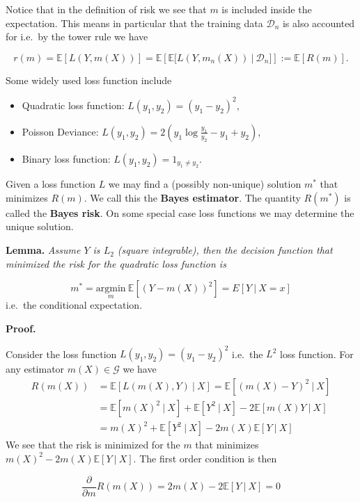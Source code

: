 \documentclass[
]{book}
\providecommand{\tightlist}{%
  \setlength{\itemsep}{0pt}\setlength{\parskip}{0pt}}
\begin{document}
Notice that in the definition of risk we see that \(m\) is included inside the expectation. This means in particular that the training data \(\mathcal{D}_n\) is also accounted for i.e.~by the tower rule we have

\[
r(m)=\mathbb{E}[L(Y,m(X))]=\mathbb{E}\left[\mathbb{E}\Big[L(Y,m_n(X))\ \Big\vert\ \mathcal{D}_n\Big]\right]:=\mathbb{E}\left[R(m)\right].
\]

Some widely used loss function include

\begin{itemize}
\tightlist
\item
  Quadratic loss function: \(L(y_1,y_2)=(y_1-y_2)^2\),
\item
  Poisson Deviance: \(L(y_1,y_2)=2\left(y_1\log\frac{y_1}{y_2}-y_1+y_2\right)\),
\item
  Binary loss function: \(L(y_1,y_2)=1_{y_1\ne y_2}\).
\end{itemize}

Given a loss function \(L\) we may find a (possibly non-unique) solution \(m^*\) that minimizes \(R(m)\). We call this the \textbf{Bayes estimator}. The quantity \(R(m^*)\) is called the \textbf{Bayes risk}. On some special case loss functions we may determine the unique solution.

\textbf{Lemma.} \emph{Assume \(Y\) is \(L_2\) (square integrable), then the decision function that minimized the risk for the quadratic loss function is}

\[
m^*=\underset{m}{\text{argmin}}\ \mathbb{E}[(Y-m(X))^2]=E[Y\ \vert\ X=x]
\]
i.e.~the conditional expectation.

\textbf{Proof.}

Consider the loss function \(L(y_1,y_2)=(y_1-y_2)^2\) i.e.~the \(L^2\) loss function. For any estimator \(m(X)\in \mathcal G\) we have
\begin{align*}
R(m(X))&=\mathbb E[L(m(X),Y)\ \vert\ X]=\mathbb E[(m(X)-Y)^2\ \vert\ X]\\
&=\mathbb E[m(X)^2\ \vert\ X]+\mathbb E[Y^2\ \vert\ X]-2\mathbb E[m(X)Y\ \vert\ X]\\
&=m(X)^2+\mathbb E[Y^2\ \vert\ X]-2m(X)\mathbb E[Y\ \vert\ X]
\end{align*}
We see that the risk is minimized for the \(m\) that minimizes \(m(X)^2-2m(X)\mathbb E[Y\ \vert\ X]\). The first order condition is then

\[
\frac{\partial}{\partial m}R(m(X))=2m(X)-2\mathbb E[Y\ \vert\ X]=0
\]
\end{document}
